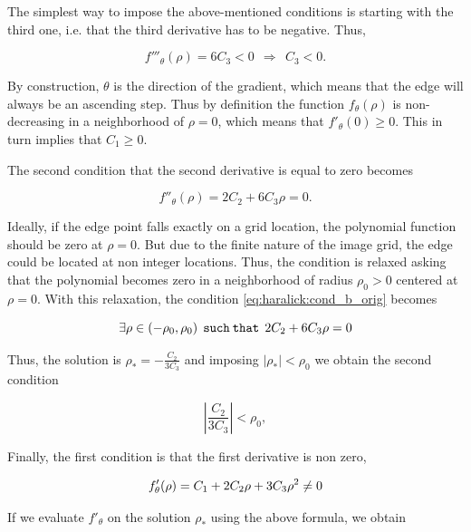 \documentclass{ipol}
\numberwithin{equation}{section}
\numberwithin{table}{section}
\begin{document}
The simplest way to impose the above-mentioned conditions is starting with the third one, i.e. that the third derivative has to be negative. Thus,

\begin{equation}
	f'''_{\theta}(\rho) = 6C_3 < 0 \ \ \Rightarrow \ \ C_3 < 0.
\end{equation}

By construction, $\theta$ is the direction of the gradient, which means that the edge will always be an ascending step. Thus by definition the function $f_{\theta}(\rho)$ is non-decreasing in a neighborhood of $\rho=0$, which means that $f'_{\theta}(0) \geq 0$. This in turn implies that $C_1 \geq 0$.

The second condition that the second derivative is equal to zero becomes

\begin{equation}\label{eq:haralick:cond_b_orig}
	f''_{\theta}(\rho) = 2C_2 + 6C_3\rho = 0.	
\end{equation}

Ideally, if the edge point falls exactly on a grid location, the polynomial function 
should be zero at $\rho=0$. But due to the finite nature of the image grid, the edge could be located at non integer locations. Thus, the condition is relaxed asking that the polynomial becomes zero in a neighborhood of radius $\rho_0>0$ centered at $\rho=0$. 
With this relaxation, the condition \ref{eq:haralick:cond_b_orig} becomes

\begin{equation}
\exists\rho \in (-\rho_0,\rho_0) \:\:  \mathtt{such\:that}  \:\:  2C_2 + 6C_3\rho = 0 \\
\end{equation}

Thus, the solution is $\rho_*=-\frac{C_2}{3C_3} $ and imposing $|\rho_*|<\rho_0$ we obtain the second condition

\begin{equation}
\left| \frac{C_2}{3C_3} \right| < \rho_0,
\end{equation}

Finally,  the first condition is that the first derivative is non zero, 

\begin{equation}\label{eq:cond:first}
f'_{\theta}(\rho) = C_1 + 2C_2\rho + 3C_3\rho^2 \neq 0 \\
\end{equation}

If we evaluate $f'_{\theta}$ on the solution $\rho_*$ using the above formula, we obtain
\end{document}
